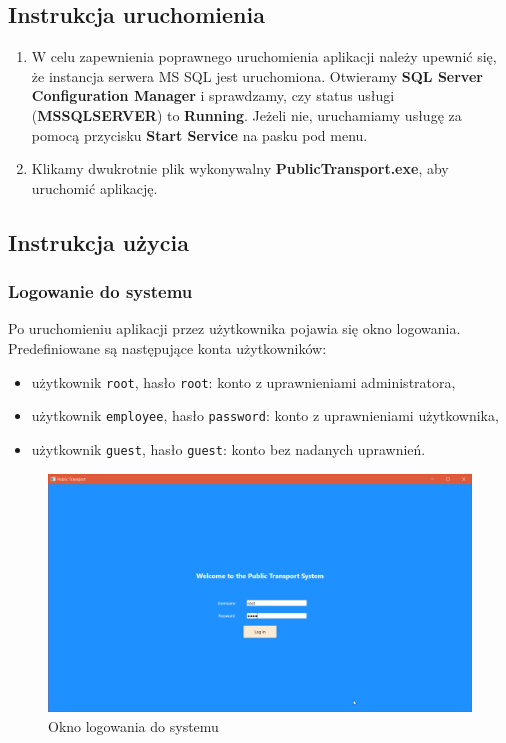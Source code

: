 \documentclass[10pt,a4paper]{article}
\begin{document}
\subsection{Instrukcja uruchomienia}
\begin{enumerate}
	\item W celu zapewnienia poprawnego uruchomienia aplikacji należy upewnić się, że instancja serwera MS SQL jest uruchomiona. Otwieramy \textbf{SQL Server Configuration Manager} i sprawdzamy, czy status usługi (\textbf{MSSQLSERVER}) to \textbf{Running}. Jeżeli nie, uruchamiamy usługę za pomocą przycisku \textbf{Start Service} na pasku pod menu.
	\item Klikamy dwukrotnie plik wykonywalny \textbf{PublicTransport.exe}, aby uruchomić aplikację.
\end{enumerate}

\subsection{Instrukcja użycia}

\subsubsection{Logowanie do systemu}
Po uruchomieniu aplikacji przez użytkownika pojawia się okno logowania. Predefiniowane są następujące konta użytkowników:
\begin{itemize}
	\item użytkownik \texttt{root}, hasło \texttt{root}: konto z uprawnieniami administratora,
	\item użytkownik \texttt{employee}, hasło \texttt{password}: konto z uprawnieniami użytkownika,
	\item użytkownik \texttt{guest}, hasło \texttt{guest}: konto bez nadanych uprawnień.
\end{itemize}
\begin{figure}[H]
	\centering
	\includegraphics[width=15cm]{screenshots/01_login_screen.png}
	\caption{Okno logowania do systemu}
\end{figure}
\end{document}
